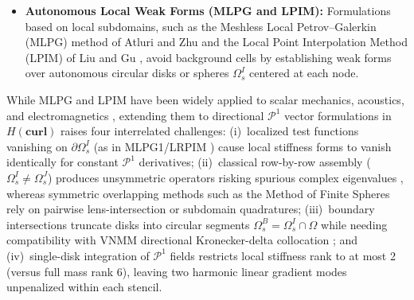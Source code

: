 \documentclass[VANCOUVER,Times1COL]{WileyNJD-v5}
\begin{document}
\begin{itemize}
    \item \textbf{Autonomous Local Weak Forms (MLPG and LPIM):} Formulations based on local subdomains, such as the Meshless Local Petrov--Galerkin (MLPG) method of Atluri and Zhu \cite{atluri1998new, atluri2002meshless} and the Local Point Interpolation Method (LPIM) of Liu and Gu \cite{liu2001local, liu2005introduction}, avoid background cells by establishing weak forms over autonomous circular disks or spheres $\Omega_s^I$ centered at each node.
\end{itemize}

While MLPG and LPIM have been widely applied to scalar mechanics, acoustics, and electromagnetics \cite{sladek2001local, atluri2002meshless, liu2001local, nicomedes2012meshless}, extending them to directional $\mathcal{P}^1$ vector formulations in $H(\mathbf{curl})$ raises four interrelated challenges: (i)~localized test functions vanishing on $\partial\Omega_s^I$ (as in MLPG1/LRPIM \cite{atluri1998new, atluri2002meshless, liu2005introduction}) cause local stiffness forms to vanish identically for constant $\mathcal{P}^1$ derivatives; (ii)~classical row-by-row assembly ($\Omega_s^I \ne \Omega_s^J$) \cite{atluri2002meshless, liu2001local, nicomedes2012meshless} produces unsymmetric operators risking spurious complex eigenvalues \cite{saad2011numerical, boffi2013mixed}, whereas symmetric overlapping methods such as the Method of Finite Spheres \cite{de2000method, nicomedes2017meshfree, nicomedes2021acoustic} rely on pairwise lens-intersection or subdomain quadratures; (iii)~boundary intersections truncate disks into circular segments $\Omega_s^B = \Omega_s^I \cap \Omega$ while needing compatibility with VNMM directional Kronecker-delta collocation \cite{ortiz2021nodal, goncalves2023vector, stable_vnmm2d_2026}; and (iv)~single-disk integration of $\mathcal{P}^1$ fields restricts local stiffness rank to at most 2 (versus full mass rank 6), leaving two harmonic linear gradient modes unpenalized within each stencil.
\end{document}
